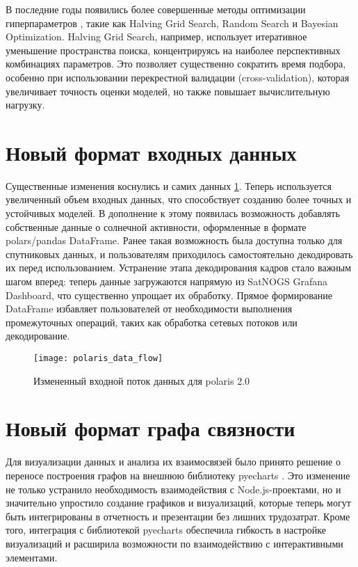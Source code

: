 В последние годы появились более совершенные методы оптимизации гиперпараметров \cite{grid_search_tuning}, такие как Halving Grid Search, Random Search и Bayesian Optimization. Halving Grid Search, например, использует итеративное уменьшение пространства поиска, концентрируясь на наиболее перспективных комбинациях параметров. Это позволяет существенно сократить время подбора, особенно при использовании перекрестной валидации (cross-validation), которая увеличивает точность оценки моделей, но также повышает вычислительную нагрузку.

\section{Новый формат входных данных}

Существенные изменения коснулись и самих данных \ref{fig:polaris_data_flow}. Теперь используется увеличенный объем входных данных, что способствует созданию более точных и устойчивых моделей. В дополнение к этому появилась возможность добавлять собственные данные о солнечной активности, оформленные в формате polars/pandas DataFrame. Ранее такая возможность была доступна только для спутниковых данных, и пользователям приходилось самостоятельно декодировать их перед использованием. Устранение этапа декодирования кадров стало важным шагом вперед: теперь данные загружаются напрямую из SatNOGS Grafana Dashboard, что существенно упрощает их обработку. Прямое формирование DataFrame избавляет пользователей от необходимости выполнения промежуточных операций, таких как обработка сетевых потоков или декодирование.

\begin{figure}[H]
	\centering
	\texttt{[image: polaris\_data\_flow]}
	\caption{Измененный входной поток данных для polaris 2.0}
	\label{fig:polaris_data_flow}
\end{figure}

\section{Новый формат графа связности}

Для визуализации данных и анализа их взаимосвязей было принято решение о переносе построения графов на внешнюю библиотеку pyecharts \cite{pyecharts_docs}. Это изменение не только устранило необходимость взаимодействия с Node.js-проектами, но и значительно упростило создание графиков и визуализаций, которые теперь могут быть интегрированы в отчетность и презентации без лишних трудозатрат. Кроме того, интеграция с библиотекой pyecharts обеспечила гибкость в настройке визуализаций и расширила возможности по взаимодействию с интерактивными элементами.

